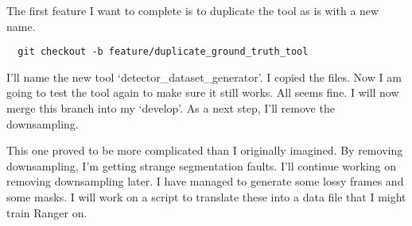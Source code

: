\documentclass[12pt,oneside]{book}
\begin{document}
The first feature I want to complete is to duplicate the tool as is with a new name.
\begin{lstlisting}
  git checkout -b feature/duplicate_ground_truth_tool\end{lstlisting}

I'll name the new tool `detector\_dataset\_generator'. I copied the files. Now I am going to test the tool again to make sure it still works. All seems fine. I will now merge this branch into my `develop'. As a next step, I'll remove the downsampling.

This one proved to be more complicated than I originally imagined. By removing downsampling, I'm getting strange segmentation faults. I'll continue working on removing downsampling later. I have managed to generate some lossy frames and some masks. I will work on a script to translate these into a data file that I might train Ranger on.

  \printbibliography[title={Bibliografía},heading=bibintoc]
\end{document}
